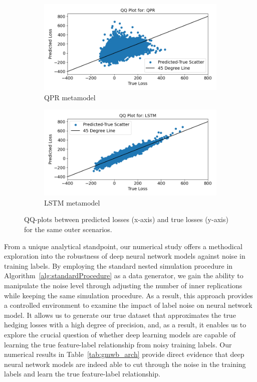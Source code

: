 \documentclass{article}
\begin{document}
\begin{figure}[ht!]
    \centering
    \begin{subfigure}{0.45\textwidth}
        \includegraphics[width=\textwidth]{./figures/QPR_QQ.png}
        \caption{QPR metamodel}
    \end{subfigure}\hfill
    \begin{subfigure}{0.45\textwidth}
        \includegraphics[width=\textwidth]{./figures/LSTM_QQ.png}
        \caption{LSTM metamodel}
    \end{subfigure}
    \caption{QQ-plots between predicted losses (x-axis) and true losses (y-axis) for the same outer scenarios.} 
    \label{fig:QQ_GMWB}
\end{figure}

From a unique analytical standpoint, our numerical study offers a methodical exploration into the robustness of deep neural network models against noise in training labels. 
By employing the standard nested simulation procedure in Algorithm~\ref{alg:standardProcedure} as a data generator, we gain the ability to manipulate the noise level through adjusting the number of inner replications while keeping the same simulation procedure.
As a result, this approach provides a controlled environment to examine the impact of label noise on neural network model.
It allows us to generate our true dataset that approximates the true hedging losses with a high degree of precision, and, as a result, it enables us to explore the crucial question of whether deep learning models are capable of learning the true feature-label relationship from noisy training labels.
Our numerical results in Table~\ref{tab:gmwb_arch} provide direct evidence that deep neural network models are indeed able to cut through the noise in the training labels and learn the true feature-label relationship.
\end{document}
